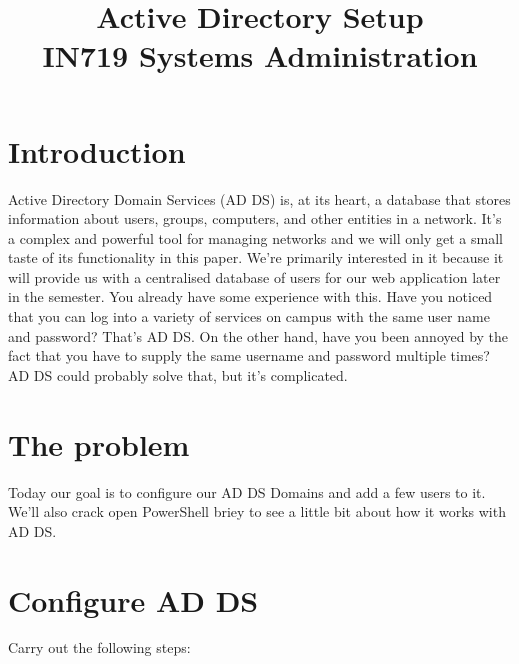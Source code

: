 \documentclass{article}
\begin{document}
\title{Active Directory Setup\\ IN719 Systems Administration}
\date{}
\maketitle

\section*{Introduction}
Active Directory Domain Services (AD DS) is, at its heart, a database that stores information about users, groups, computers, and other entities in a network. It's a complex and powerful tool for managing networks and we will only get a small taste of its functionality in this paper. We're primarily interested in it because it will provide us with a centralised database of users for our web application later in the semester. You already have some experience with this. Have you noticed that you can log into a variety of services on campus with the same user name and password? That's AD DS. On the other hand, have you been annoyed by the fact that you have to supply the same username and password multiple times? AD DS could probably solve that, but it's complicated.

\section{The problem}
Today our goal is to configure our AD DS Domains and add a few users to it. We'll also crack open PowerShell briey to see a little bit about how it works with AD DS.

\section{Configure AD DS}
Carry out the following steps:
\end{document}
